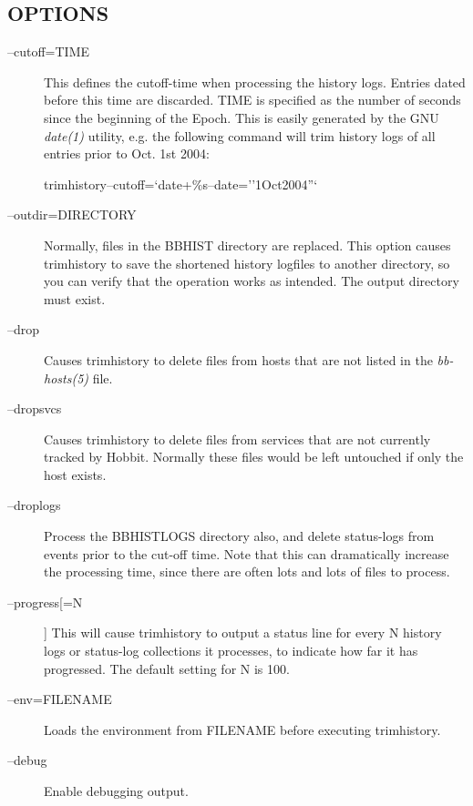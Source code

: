 \subsection{OPTIONS}
\begin{description}
\item[--cutoff=TIME] This defines the cutoff-time when processing the
  history logs. Entries dated before this time are discarded. TIME is
  specified as the number of seconds since the beginning of the
  Epoch. This is easily generated by the GNU \emph{date(1)} utility,
  e.g. the following command will trim history logs of all entries
  prior to Oct. 1st 2004:  



  
trimhistory--cutoff=`date+\%s--date=''1Oct2004''` 


 

\item[--outdir=DIRECTORY] Normally, files in the BBHIST directory are
  replaced. This option causes trimhistory to save the shortened
  history logfiles to another directory, so you can verify that the
  operation works as intended. The output directory must exist. 


 

\item[--drop] Causes trimhistory to delete files from hosts that are
  not listed in the \emph{bb-hosts(5)} file. 

 

\item[--dropsvcs] Causes trimhistory to delete files from services
  that are not currently tracked by Hobbit. Normally these files would
  be left untouched if only the host exists. 

 

\item[--droplogs] Process the BBHISTLOGS directory also, and delete
  status-logs from events prior to the cut-off time. Note that this
  can dramatically increase the processing time, since there are often
  lots and lots of files to process. 


 

\item[--progress[=N]] This will cause trimhistory to output a status
  line for every N history logs or status-log collections it
  processes, to indicate how far it has progressed. The default
  setting for N is 100. 


 

\item[--env=FILENAME] Loads the environment from FILENAME before executing trimhistory. 

 

\item[--debug] Enable debugging output. 

 
\end{description}
